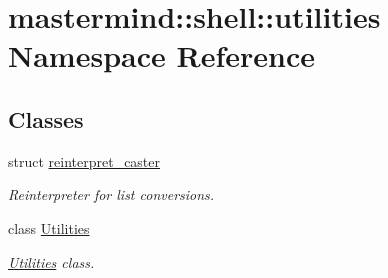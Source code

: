 \hypertarget{namespacemastermind_1_1shell_1_1utilities}{}\section{mastermind\+:\+:shell\+:\+:utilities Namespace Reference}
\label{namespacemastermind_1_1shell_1_1utilities}
\subsection*{Classes}
\begin{DoxyCompactItemize}
\item 
struct \hyperlink{structmastermind_1_1shell_1_1utilities_1_1reinterpret__caster}{reinterpret\+\_\+caster}
\begin{DoxyCompactList}\small\item\em Reinterpreter for list conversions. \end{DoxyCompactList}\item 
class \hyperlink{classmastermind_1_1shell_1_1utilities_1_1_utilities}{Utilities}
\begin{DoxyCompactList}\small\item\em \hyperlink{classmastermind_1_1shell_1_1utilities_1_1_utilities}{Utilities} class. \end{DoxyCompactList}\end{DoxyCompactItemize}
